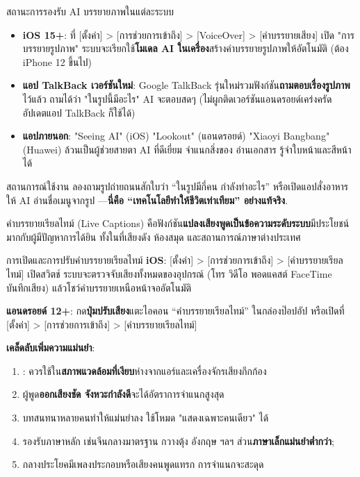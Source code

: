 \begin{tcbinfo}{สถานะการรองรับ AI บรรยายภาพในแต่ละระบบ}
\begin{itemize}
  \item \textbf{iOS 15+}: ที่ [ตั้งค่า] > [การช่วยการเข้าถึง] > [VoiceOver] > [คำบรรยายเสียง] เปิด "การบรรยายรูปภาพ" ระบบจะเรียกใช้\textbf{โมเดล AI ในเครื่อง}สร้างคำบรรยายรูปภาพให้อัตโนมัติ (ต้อง iPhone 12 ขึ้นไป)
  \item \textbf{แอป TalkBack เวอร์ชันใหม่}: Google TalkBack รุ่นใหม่รวมฟังก์ชัน\textbf{ถามตอบเรื่องรูปภาพ}ไว้แล้ว ถามได้ว่า "ในรูปนี้มีอะไร" AI จะตอบสดๆ (ไม่ผูกติดเวอร์ชันแอนดรอยด์เคร่งครัด อัปเดตแอป TalkBack ก็ใช้ได้)
  \item \textbf{แอปภายนอก}: "Seeing AI" (iOS) "Lookout" (แอนดรอยด์) "Xiaoyi Bangbang" (Huawei) ล้วนเป็นผู้ช่วยสายตา AI ที่ดีเยี่ยม จำแนกสิ่งของ อ่านเอกสาร รู้จำใบหน้าและสีหน้าได้
\end{itemize}

\end{tcbinfo}

\begin{tcbpractice}{สถานการณ์ใช้งาน}
ลองถามรูปถ่ายถนนสักใบว่า “ในรูปมีกี่คน กำลังทำอะไร” หรือเปิดแอปสั่งอาหาร ให้ AI อ่านชื่อเมนูจากรูป —\textbf{นี่คือ “เทคโนโลยีทำให้ชีวิตเท่าเทียม” อย่างแท้จริง}.

\end{tcbpractice}


คำบรรยายเรียลไทม์ (Live Captions) คือฟังก์ชัน\textbf{แปลงเสียงพูดเป็นข้อความระดับระบบ}มีประโยชน์มากกับผู้มีปัญหาการได้ยิน ทั้งในที่เสียงดัง ห้องสมุด และสถานการณ์ภาษาต่างประเทศ

\begin{tcbinfo}{การเปิดและการปรับคำบรรยายเรียลไทม์}
\textbf{iOS}: [ตั้งค่า] > [การช่วยการเข้าถึง] > [คำบรรยายเรียลไทม์] เปิดสวิตช์ ระบบจะตรวจจับเสียงทั้งหมดของอุปกรณ์ (โทร วิดีโอ พอดแคสต์ FaceTime บันทึกเสียง) แล้วโชว์คำบรรยายเหนือหน้าจออัตโนมัติ

\textbf{แอนดรอยด์ 12+}: กด\textbf{ปุ่มปรับเสียง}แตะไอคอน “คำบรรยายเรียลไทม์” ในกล่องป๊อปอัป หรือเปิดที่ [ตั้งค่า] > [การช่วยการเข้าถึง] > [คำบรรยายเรียลไทม์]

\textbf{เคล็ดลับเพิ่มความแม่นยำ}:

\begin{enumerate}
  \item : ควรใช้ใน\textbf{สภาพแวดล้อมที่เงียบ}ห่างจากแอร์และเครื่องจักรเสียงกึกก้อง
  \item ผู้พูด\textbf{ออกเสียงชัด จังหวะกำลังดี}จะได้อัตราการจำแนกสูงสุด
  \item บทสนทนาหลายคนทำให้แม่นยำลง ใช้โหมด "แสดงเฉพาะคนเดียว" ได้
  \item รองรับภาษาหลัก เช่นจีนกลางมาตรฐาน กวางตุ้ง อังกฤษ ฯลฯ ส่วน\textbf{ภาษาเล็กแม่นยำต่ำกว่า};
  \item กลางประโยคมีเพลงประกอบหรือเสียงคนพูดแทรก การจำแนกจะสะดุด
\end{enumerate}

\end{tcbinfo}

